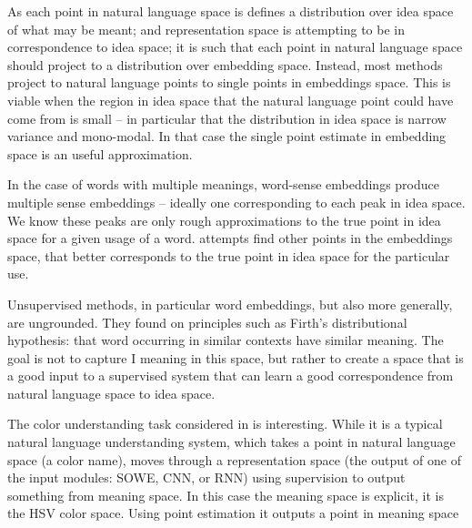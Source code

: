 \documentclass{book}
\begin{document}
As each point in natural language space is defines a distribution over idea space of what may be meant;
and representation space is attempting to be in correspondence to idea space;
it is such that each point in natural language space should project to a distribution over embedding space.
Instead, most methods project to natural language points to single points in embeddings space.
This is viable when the region in idea space that the natural language point could have come from is small -- in particular that the distribution in idea space is narrow variance and mono-modal.
In that case the single point estimate in embedding space is an useful approximation.


In the case of words with multiple meanings, 
word-sense embeddings produce multiple sense embeddings -- ideally one corresponding to each peak in idea space.
We know these peaks are only rough approximations to the true point in idea space for a given usage of a word.
 attempts find other points in the embeddings space, that better corresponds to the true point in idea space for the particular use.


Unsupervised methods, in particular word embeddings, but also more generally, are ungrounded.
They found on principles such as Firth's distributional hypothesis:
that word occurring in similar contexts have similar meaning. 
The goal is not to capture I meaning in this space,
but rather to create a space that is a good input to a supervised system that can learn a good correspondence from natural language space to idea space. 

The color understanding task considered in  is interesting.
While it is a typical natural language understanding system,
which takes a point in natural language space (a color name),
moves through a representation space (the output of one of the input modules: SOWE, CNN, or RNN) using supervision to output something from meaning space.
In this case the meaning space is explicit, it is the HSV color space.
Using point estimation it outputs a point in meaning space













\printbib
\end{document}
